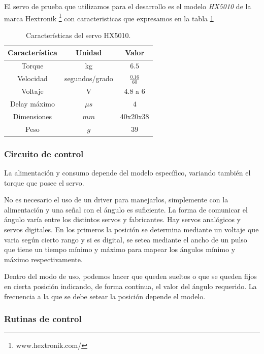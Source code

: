 El servo de prueba que utilizamos para el desarrollo es el modelo \emph{HX5010} de la marca Hextronik \footnote{www.hextronik.com/}
con caracteristicas que expresamos en la tabla \ref{hT_hx5010}

\begin{table}
	\begin{center}
		\begin{tabular}{|c|c|c|}
			\hline
			Caracter\'istica & Unidad & Valor \\
			\hline
			Torque & kg & $6.5$ \\
			Velocidad & segundos/grado & $\frac{0.16}{60}$ \\
			Voltaje & V & $4.8$ a $6$ \\
			Delay m\'aximo & $\mu s$ & $4$ \\
			Dimensiones & $mm$ & 40x20x38 \\
			Peso & $g$ & $39$ \\
			\hline
		\end{tabular}
	\end{center}
	\caption{Caracter\'isticas del servo HX5010.}
	\label{hT_hx5010}
\end{table}

\subsubsection{Circuito de control}
\label{h_actuadores_servo_circuito}

La alimentaci\'on y consumo depende del modelo espec\'ifico, variando tambi\'en el torque que posee el servo.

No es necesario el uso de un driver para manejarlos, simplemente con la alimentaci\'on y una se\~nal con el \'angulo es suficiente.
La forma de comunicar el \'angulo var\'ia entre los distintos servos y fabricantes.
Hay servos anal\'ogicos y servos digitales.
En los primeros la posici\'on se determina mediante un voltaje que varia seg\'un cierto rango y si es digital, se setea mediante el ancho de
un pulso que tiene un tiempo m\'inimo y m\'aximo para mapear los \'angulos m\'inimo y m\'aximo respectivamente.

Dentro del modo de uso, podemos hacer que queden sueltos o que se queden fijos en cierta posici\'on indicando, de forma cont\'inua, el valor
del \'angulo requerido.
La frecuencia a la que se debe setear la posici\'on depende el modelo.

\subsubsection{Rutinas de control}
\label{h_actuadores_servo_rutinas}

